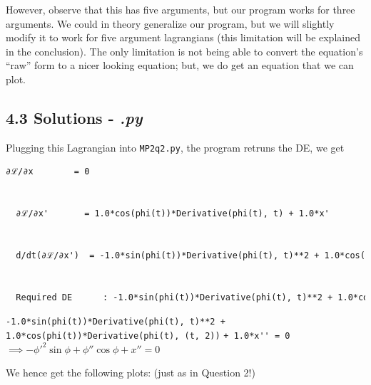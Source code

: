 \documentclass[hidelinks, 11pt]{article}
\begin{document}
\noindent However, observe that this has five arguments, but our program works for three arguments. We could in theory generalize our program, but we will slightly modify it to work for five argument lagrangians (this limitation will be explained in the conclusion). The only limitation is not being able to convert the equation's ``raw'' form to a nicer looking equation; but, we do get an equation that we can plot.


\subsection*{4.3 Solutions - \emph{.py}}

Plugging this Lagrangian into \verb|MP2q2.py|, the program retruns the DE, we get 

\begin{lstlisting}[language = html]
  ∂ℒ/∂x        = 0


  ∂ℒ/∂x'       = 1.0*cos(phi(t))*Derivative(phi(t), t) + 1.0*x'
  
  
  d/dt(∂ℒ/∂x')  = -1.0*sin(phi(t))*Derivative(phi(t), t)**2 + 1.0*cos(phi(t))*Derivative(phi(t), (t, 2)) + 1.0*x''
  
  
  Required DE      : -1.0*sin(phi(t))*Derivative(phi(t), t)**2 + 1.0*cos(phi(t))*Derivative(phi(t), (t, 2)) + 1.0*x'' = 0
\end{lstlisting} 

\noindent \verb|-1.0*sin(phi(t))*Derivative(phi(t), t)**2 + 1.0*cos(phi(t))*Derivative(phi(t), (t, 2))|
\verb|+ 1.0*x'' = 0| \\
$\implies -\phi'^2\sin{\phi} + \phi''\cos{\phi} + x'' = 0$

We hence get the following plots: (just as in Question 2!)
\end{document}
